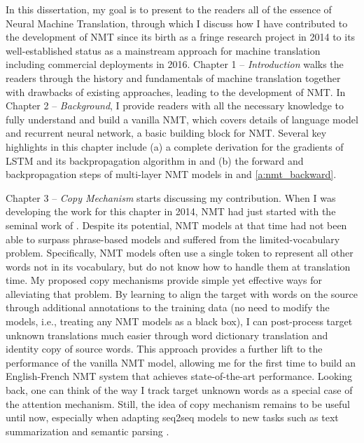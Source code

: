 In this dissertation, my goal is to present to the readers all of the essence of Neural Machine Translation, through which I discuss how I have contributed to the development of NMT since its birth as a fringe research project in 2014 to its well-established status as a mainstream approach for machine translation including commercial deployments in 2016. Chapter 1 -- {\it Introduction} walks the readers through the history and fundamentals of machine translation together with drawbacks of existing approaches, leading to the development of NMT. In Chapter 2 -- {\it Background}, I provide readers with all the necessary knowledge to fully understand and build a vanilla NMT, which covers details of language model and recurrent neural network, a basic building block for NMT. Several key highlights in this chapter include (a) a complete derivation for the gradients of LSTM and its backpropagation algorithm in  and (b) the forward and backpropagation steps of multi-layer NMT models in  and \ref{a:nmt_backward}. 

Chapter 3 -- {\it Copy Mechanism} starts discussing my contribution. When I was developing the work for this chapter in 2014,
NMT had just started with the seminal work of . Despite its potential, NMT models at that time had not been able to surpass phrase-based models and suffered from the limited-vocabulary problem. Specifically, NMT models often use a single \unk{} token to represent all other words not in its vocabulary, but do not know how to handle them at translation time. My proposed copy mechanisms provide simple yet effective ways for alleviating that problem. By learning to align the target \unk{} with words on the source through additional annotations to the training data (no need to modify the models, i.e., treating any NMT models as a black box), I can post-process target unknown translations much easier through word dictionary translation and identity copy of source words. This approach provides a further lift to the performance of the vanilla NMT model, allowing me for the first time to build an English-French NMT system that achieves state-of-the-art performance. Looking back, one can think of the way I track target unknown words as a special case of the attention mechanism.
Still, the idea of copy mechanism remains to be useful until now, especially when adapting seq2seq models to new tasks such as text summarization \cite{gu16,gulcehre16} and semantic parsing \cite{jia16}.

